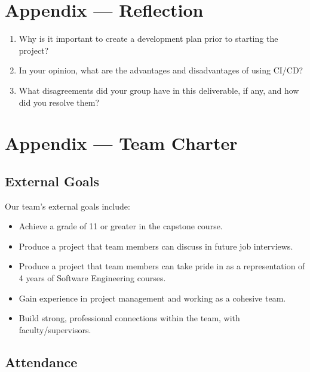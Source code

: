 \documentclass{article}
\begin{document}
\newpage{}

\section*{Appendix --- Reflection}




\begin{enumerate}
    \item Why is it important to create a development plan prior to starting the
    project?
    \item In your opinion, what are the advantages and disadvantages of using
    CI/CD?
    \item What disagreements did your group have in this deliverable, if any,
    and how did you resolve them?
\end{enumerate}

\newpage{}

\section*{Appendix --- Team Charter}


\subsection*{External Goals}

Our team's external goals include:

\begin{itemize}
    \item Achieve a grade of 11 or greater in the capstone course.
    \item Produce a project that team members can discuss in future job interviews.
    \item Produce a project that team members can take pride in as a representation of 4 years of Software Engineering courses.
    \item Gain experience in project management and working as a cohesive team.
    \item Build strong, professional connections within the team, with faculty/supervisors.

\end{itemize}

\subsection*{Attendance}
\end{document}
